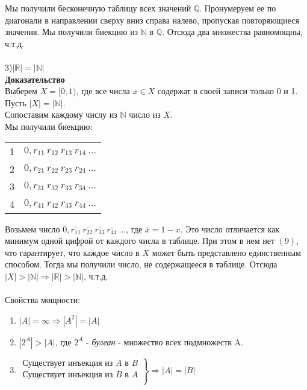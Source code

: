 \documentclass[12pt]{article}
\begin{document}
Мы получили бесконечную таблицу всех значений $\mathbb{Q}$. Пронумеруем ее по диагонали в направлении сверху вниз справа налево, пропуская повторяющиеся значения. Мы получили биекцию из $\mathbb{N}$ в $\mathbb{Q}$. Отсюда два множества равномощны, ч.т.д.\\\\
3)$|\mathbb{R}| = |\mathbb{N}|$\\
\textbf{Доказательство}\\
Выберем $X=[0;1)$, где все числа $x \in X$ содержат в своей записи только 0 и 1.\\
Пусть $|X| = |\mathbb{N}|$.\\
Сопоставим каждому числу из $\mathbb{N}$ число из $X$.\\
Мы получили биекцию:
\begin{center}
    \begin{tabular}{c|c}
        1 & $0,r_{11}\ r_{12}\ r_{13}\ r_{14}\ ...$ \\
        2 & $0,r_{21}\ r_{22}\ r_{23}\ r_{24}\ ...$\\
        3 & $0,r_{31}\ r_{32}\ r_{33}\ r_{34}\ ...$\\
        4 & $0,r_{41}\ r_{42}\ r_{43}\ r_{44}\ ...$\\
    \end{tabular}
\end{center}
Возьмем число $0,\overline{r_{11}}\ \overline{r_{22}}\ \overline{r_{33}}\ \overline{r_{44}}\ ...$, где $\overline{x} = 1-x$. Это число отличается как минимум одной цифрой от каждого числа в таблице. При этом в нем нет $(9)$, что гарантирует, что каждое число в $X$ может быть представлено единственным способом. Тогда мы получили число, не содержащееся в таблице. Отсюда $|X| > |\mathbb{N}| \Rightarrow |\mathbb{R}| > |\mathbb{N}|$, ч.т.д.\\\\
Свойства мощности:
\begin{enumerate}
    \item $|A| = \infty \Rightarrow |A^2| = |A|$
    \item $|2^A| > |A|$, где $2^A$ - \textit{булеан} - множество всех подмножеств A.
    \item {
            $\left.
          \begin{array}{l}
            \text{Существует инъекция из }A\text{ в }B\\
            \text{Существует инъекция из }B\text{ в }A \\
          \end{array}
        \right\} \Rightarrow |A| = |B|$
        }
\end{enumerate}
\end{document}
